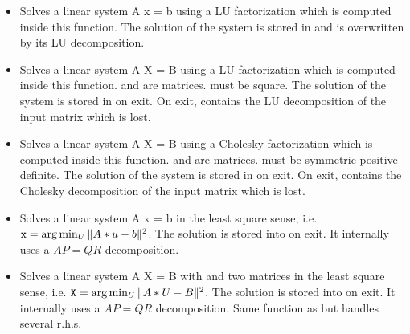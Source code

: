 \begin{itemize}
\item {} 
  \sshortdescribe Solves a linear system A x = b using a LU factorization
  which is computed inside this function. The solution of the system is stored
  in  and  is overwritten by its LU decomposition.

\item {} 
  \sshortdescribe Solves a linear system A X = B using a LU factorization
  which is computed inside this function.  and   are
  matrices.  must be square. The solution of the system is stored in
   on exit. On exit,  contains the LU decomposition of the input
  matrix which is lost.

\item {}
  \sshortdescribe Solves a linear system A X = B
  using a Cholesky factorization which is computed inside this
  function.  and  are matrices.  must be symmetric
  positive definite. The solution of the system is stored in  on
  exit. On exit,  contains the Cholesky decomposition of the input
  matrix which is lost.

\item {}
  \sshortdescribe Solves a linear system A x = b in the least square sense,
  i.e. ${\tt x} = \arg\min_U \| A * u - b\|^2$. The solution is stored into
   on exit. It internally uses a $AP = QR$ decomposition.

\item {}
  \sshortdescribe Solves a linear system A X = B with  and  two
  matrices in the least square sense, i.e. ${\tt X} = \arg\min_U \| A * U -
  B\|^2$. The solution is stored into  on exit. It internally uses a
  $AP = QR$ decomposition. Same function as  but handles
  several r.h.s.

\end{itemize}


